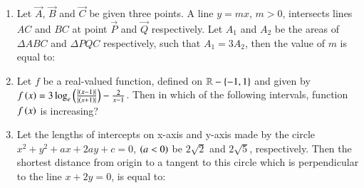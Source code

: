 \documentclass[journal,12pt,onecolumn]{IEEEtran}
\theoremstyle{remark}
\begin{document}
\begin{enumerate}
\item Let $\vec{A}$, $\vec{B}$ and $\vec{C}$ be given three points. A line $y = mx$, $m > 0$, intersects lines $AC$ and $BC$ at point $\vec{P}$ and $\vec{Q}$ respectively. Let $A_1$ and $A_2$ be the areas of $\Delta ABC$ and $\Delta PQC$ respectively, such that $A_1 = 3A_2$, then the value of $m$ is equal to:

\hfill{}
\begin{enumerate}
\end{enumerate}

\item Let $f$ be a real-valued function, defined on $\mathbb{R}-\left\{-1, 1\right\}$ and given by $f\left(x\right) = 3\log_e\left({\frac{\left\vert\left(x-1\right)\right\vert}{\left\vert\left(x+1\right)\right\vert}}\right)-\frac{2}{x-1}$. Then in which of the following intervals, function $f\left(x\right)$ is increasing?

\hfill{}
\begin{enumerate}
\end{enumerate}

\item Let the lengths of intercepts on x-axis and y-axis made by the circle $x^2+y^2+ax+2ay+c=0$, $\left(a<0\right)$ be $2\sqrt{2}$ and $2\sqrt{5}$, respectively. Then the shortest distance from origin to a tangent to this circle which is perpendicular to the line $x+2y=0$, is equal to:

\hfill{}
\begin{enumerate}
\end{enumerate}


\end{enumerate}
\end{document}
